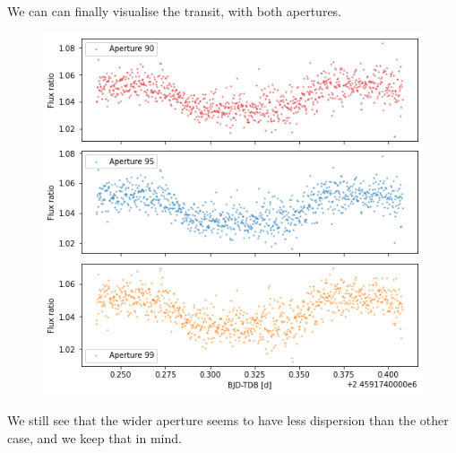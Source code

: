 \documentclass[a4paper,11pt,twocolumn]{article}
\begin{document}
We can can finally visualise the transit, with both apertures.
\begin{figure}[H]
    \centering  
    \includegraphics[scale=0.45, angle=0]{../pictures/taste/transits.png}
\end{figure}
We still see that the wider aperture seems to have less dispersion than 
the other case, and we keep that in mind.
\end{document}
